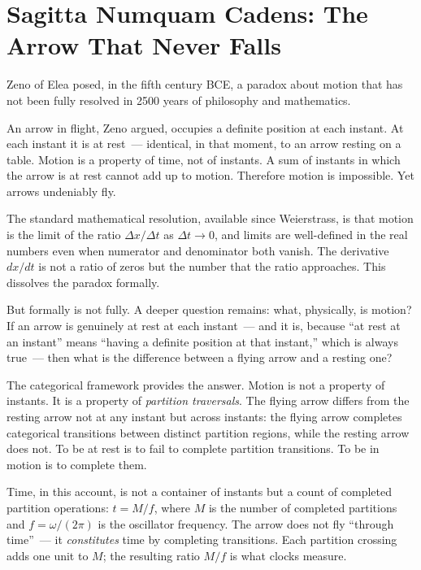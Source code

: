 \section*{Sagitta Numquam Cadens: The Arrow That Never Falls}

Zeno of Elea posed, in the fifth century BCE, a paradox about motion that has not
been fully resolved in 2500 years of philosophy and mathematics.

An arrow in flight, Zeno argued, occupies a definite position at each instant.
At each instant it is at rest~--- identical, in that moment, to an arrow resting
on a table. Motion is a property of time, not of instants. A sum of instants in which
the arrow is at rest cannot add up to motion. Therefore motion is impossible.
Yet arrows undeniably fly.

The standard mathematical resolution, available since Weierstrass, is that motion is
the limit of the ratio $\Delta x / \Delta t$ as $\Delta t \to 0$, and limits are
well-defined in the real numbers even when numerator and denominator both vanish.
The derivative $dx/dt$ is not a ratio of zeros but the number that the ratio
approaches. This dissolves the paradox formally.

But formally is not fully. A deeper question remains: what, physically, is motion?
If an arrow is genuinely at rest at each instant~--- and it is, because ``at rest
at an instant'' means ``having a definite position at that instant,'' which is always
true~--- then what is the difference between a flying arrow and a resting one?

The categorical framework provides the answer. Motion is not a property of instants.
It is a property of \emph{partition traversals}. The flying arrow differs from the
resting arrow not at any instant but across instants: the flying arrow completes
categorical transitions between distinct partition regions, while the resting arrow
does not. To be at rest is to fail to complete partition transitions. To be in motion
is to complete them.

Time, in this account, is not a container of instants but a count of completed
partition operations: $t = M/f$, where $M$ is the number of completed partitions
and $f = \omega/(2\pi)$ is the oscillator frequency. The arrow does not fly
``through time''~--- it \emph{constitutes} time by completing transitions.
Each partition crossing adds one unit to $M$; the resulting ratio $M/f$ is what
clocks measure.

